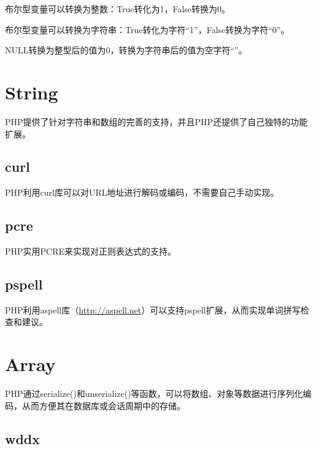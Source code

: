 \begin{compactitem}
\item 布尔型变量可以转换为整数：True转化为1，False转换为0。

\item 布尔型变量可以转换为字符串：True转化为字符“1”，False转换为字符“0”。
\end{compactitem}

NULL转换为整型后的值为0，转换为字符串后的值为空字符“”。









\section{String}

PHP提供了针对字符串和数组的完善的支持，并且PHP还提供了自己独特的功能扩展。

\subsection{curl}

PHP利用curl库可以对URL地址进行解码或编码，不需要自己手动实现。

\subsection{pcre}

PHP实用PCRE来实现对正则表达式的支持。

\subsection{pspell}

PHP利用aspell库（\url{http://aspell.net}）可以支持pspell扩展，从而实现单词拼写检查和建议。


\section{Array}



PHP通过serialize()和unserialize()等函数，可以将数组、对象等数据进行序列化编码，从而方便其在数据库或会话周期中的存储。


\subsection{wddx}


